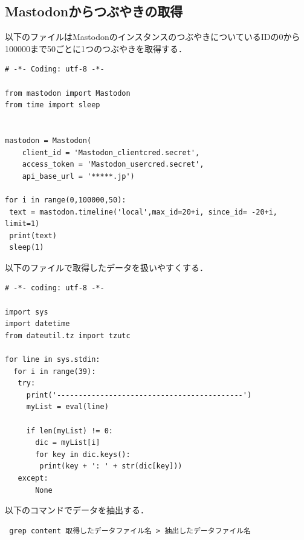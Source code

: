 \subsection{Mastodonからつぶやきの取得}
以下のファイルはMastodonのインスタンスのつぶやきについているIDの0から100000まで50ごとに1つのつぶやきを取得する．
\begin{lstlisting}[breaklines = true, basicstyle=\ttfamily\footnotesize, frame=single]
# -*- Coding: utf-8 -*-

from mastodon import Mastodon
from time import sleep


mastodon = Mastodon(
    client_id = 'Mastodon_clientcred.secret',
    access_token = 'Mastodon_usercred.secret',
    api_base_url = '*****.jp')

for i in range(0,100000,50):
 text = mastodon.timeline('local',max_id=20+i, since_id= -20+i, limit=1)
 print(text)
 sleep(1)
 \end{lstlisting}
 \newpage
 以下のファイルで取得したデータを扱いやすくする．
 \begin{lstlisting}[breaklines = true, basicstyle=\ttfamily\footnotesize, frame=single]
 # -*- coding: utf-8 -*-

import sys
import datetime
from dateutil.tz import tzutc

for line in sys.stdin:
  for i in range(39):
   try:
     print('-------------------------------------------')
     myList = eval(line)
 
     if len(myList) != 0:
       dic = myList[i]
       for key in dic.keys():
        print(key + ': ' + str(dic[key]))
   except:
       None
\end{lstlisting}
 \newpage
 以下のコマンドでデータを抽出する．
 \begin{verbatim}
 grep content 取得したデータファイル名 > 抽出したデータファイル名
 \end{verbatim}
 \newpage
